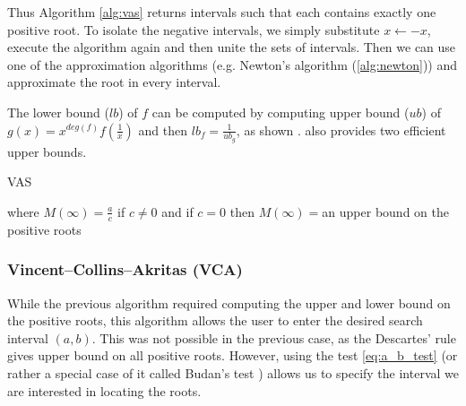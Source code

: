 \documentclass[
  digital, %
  notable,   %
  nolof,     %
  nolot,     %
	final, %
]{fithesis3}
\begin{document}
Thus Algorithm \ref{alg:vas} returns intervals such that each contains exactly one positive root. To isolate the negative intervals, we simply substitute $x\leftarrow -x$, execute the algorithm again and then unite the sets of intervals. Then we can use one of the approximation algorithms (e.g. Newton's algorithm (\ref{alg:newton})) and approximate the root in every interval.

The lower bound ($lb$) of $f$ can be computed by computing upper bound ($ub$) of $g(x)=x^{deg(f)}f(\frac{1}{x})$ and then $lb_{f} = \frac{1}{ub_{g}}$, as shown \parencite{vigklasphd}. \parencite{vigklasphd} also provides two efficient upper bounds.

\begin{algorithm}
  \caption{VAS
    \label{alg:vas}}
  \begin{algorithmic}[1]
    \Statex
				\State\Return{$\emptyset$}
			\EndIf
				 where $M(\infty)=\frac{a}{c}$ if $c\neq 0$
				 and if $c=0$ then $M(\infty)=$an upper bound on the positive roots
				\State{}
			\EndIf
			\EndIf
				\State{}
			\Else
				\State{}
			\EndIf
    \EndFunction
  \end{algorithmic}
\end{algorithm}

\subsubsection{\textbf{Vincent–Collins–Akritas (VCA)} \parencite{vca}}
While the previous algorithm required computing the upper and lower bound on the positive roots, this algorithm allows the user to enter the desired search interval $(a,b)$. This was not possible in the previous case, as the Descartes' rule gives upper bound on all positive roots. However, using the test \eqref{eq:a_b_test} (or rather a special case of it called Budan's test \parencite{budan}) allows us to specify the interval we are interested in locating the roots.
\end{document}
